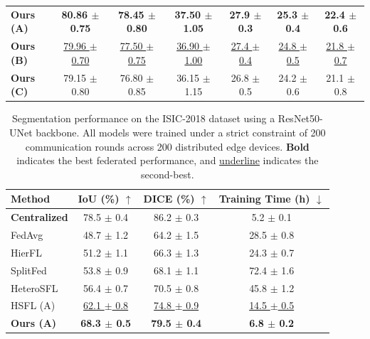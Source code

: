 \begin{table}[t]
{\begin{tabular}{l|ccc|ccc}
        \midrule
        \textbf{Ours (A)} & \textbf{80.86 {\scriptsize $\pm$ 0.75}} & \textbf{78.45 {\scriptsize $\pm$ 0.80}} & \textbf{37.50 {\scriptsize $\pm$ 1.05}} & \textbf{27.9 {\scriptsize $\pm$ 0.3}} & \textbf{25.3 {\scriptsize $\pm$ 0.4}} & \textbf{22.4 {\scriptsize $\pm$ 0.6}} \\
        \textbf{Ours (B)} & \underline{79.96 {\scriptsize $\pm$ 0.70}} & \underline{77.50 {\scriptsize $\pm$ 0.75}} & \underline{36.90 {\scriptsize $\pm$ 1.00}} & \underline{27.4 {\scriptsize $\pm$ 0.4}} & \underline{24.8 {\scriptsize $\pm$ 0.5}} & \underline{21.8 {\scriptsize $\pm$ 0.7}} \\
        \textbf{Ours (C)} & 79.15 {\scriptsize $\pm$ 0.80} & 76.80 {\scriptsize $\pm$ 0.85} & 36.15 {\scriptsize $\pm$ 1.15} & 26.8 {\scriptsize $\pm$ 0.5} & 24.2 {\scriptsize $\pm$ 0.6} & 21.1 {\scriptsize $\pm$ 0.8} \\
        \bottomrule
    \end{tabular}
    }
\end{table}
\begin{table}[htbp]
    \centering
    \caption{Segmentation performance on the ISIC-2018 dataset using a ResNet50-UNet backbone. All models were trained under a strict constraint of 200 communication rounds across 200 distributed edge devices. \textbf{Bold} indicates the best federated performance, and \underline{underline} indicates the second-best.}
    \label{tab:segmentation_results}
    \begin{tabular}{l|c c c}
        \toprule
        \textbf{Method} & \textbf{IoU (\%)} $\uparrow$ & \textbf{DICE (\%)} $\uparrow$ & \textbf{Training Time (h)} $\downarrow$\\ 
        \midrule\midrule
        \textbf{Centralized} & 78.5 {\scriptsize $\pm$ 0.4} & 86.2 {\scriptsize $\pm$ 0.3} & 5.2 {\scriptsize $\pm$ 0.1} \\
        \midrule
        FedAvg          & 48.7 {\scriptsize $\pm$ 1.2} & 64.2 {\scriptsize $\pm$ 1.5} & 28.5 {\scriptsize $\pm$ 0.8} \\ 
        HierFL          & 51.2 {\scriptsize $\pm$ 1.1} & 66.3 {\scriptsize $\pm$ 1.3} & 24.3 {\scriptsize $\pm$ 0.7} \\
        SplitFed        & 53.8 {\scriptsize $\pm$ 0.9} & 68.1 {\scriptsize $\pm$ 1.1} & 72.4 {\scriptsize $\pm$ 1.6} \\
        HeteroSFL       & 56.4 {\scriptsize $\pm$ 0.7} & 70.5 {\scriptsize $\pm$ 0.8} & 45.8 {\scriptsize $\pm$ 1.2} \\
        HSFL (A)        & \underline{62.1 {\scriptsize $\pm$ 0.8}} & \underline{74.8 {\scriptsize $\pm$ 0.9}} & \underline{14.5 {\scriptsize $\pm$ 0.5}} \\
        \midrule
        \textbf{Ours (A)} & \textbf{68.3 {\scriptsize $\pm$ 0.5}} & \textbf{79.5 {\scriptsize $\pm$ 0.4}} & \textbf{6.8 {\scriptsize $\pm$ 0.2}} \\ 
        \bottomrule
    \end{tabular}
\end{table}

